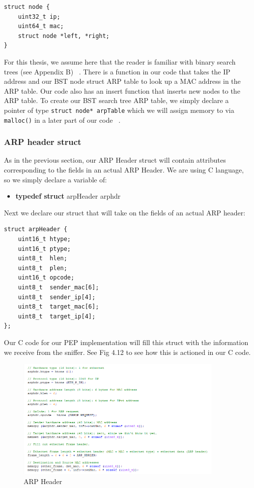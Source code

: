 \begin{lstlisting}
struct node {
	uint32_t ip;
	uint64_t mac;
	struct node *left, *right;       
}
\end{lstlisting} 

For this thesis, we assume here that the reader is familiar with binary search trees (see Appendix B) ~\cite{42}. There is a function in our code that takes the IP address and our BST node struct ARP table to look up a MAC address in the ARP table. Our code also has an insert function that inserts new nodes to the ARP table. To create our BST search tree ARP table, we simply declare a pointer of type {\tt struct node* arpTable} which we will assign memory to via {\tt malloc()} in a later part of our code ~\cite{39}.

\subsubsection*{ARP header struct}
As in the previous section, our ARP Header struct will contain attributes corresponding to the fields in an actual ARP Header. We are using C language, so we simply declare a variable of:\\

\begin{itemize}
\item \textbf{typedef struct} arpHeader arphdr\\
\end{itemize}

Next we declare our struct that will take on the fields of an actual ARP header:

\begin{lstlisting}
struct arpHeader {
    uint16_t htype;
    uint16_t ptype;
    uint8_t  hlen;
    uint8_t  plen;
    uint16_t opcode;
    uint8_t  sender_mac[6];
    uint8_t  sender_ip[4];
    uint8_t  target_mac[6];
    uint8_t  target_ip[4];
};
\end{lstlisting}

Our C code for our PEP implementation will fill this struct with the information we receive from the sniffer. See Fig 4.12 to see how this is actioned in our C code. \\

\begin{figure}[h!]
    \centering
    \includegraphics[width=0.9\textwidth]{Capture.PNG}
    \caption{ARP Header}
    \label{fig:Filling fields of ArpHeader struct}
\end{figure}

